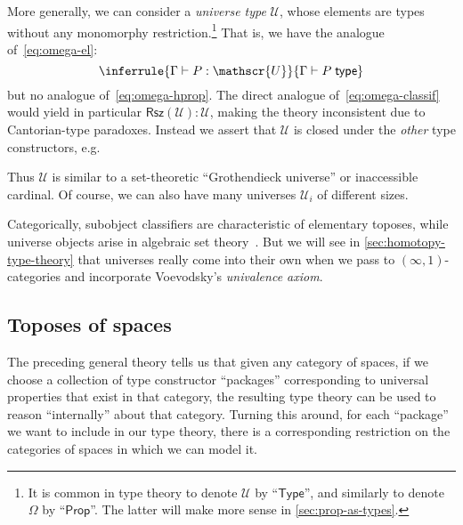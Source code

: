 \documentclass[10pt]{article}
\def\oo{\ensuremath{\infty}}
\def\io{\ensuremath{(\oo,1)}}
\def\ty{\;\mathsf{type}}
\def\tprod{\textstyle\prod}
\def\tsm{\textstyle\sum}
\def\types{\vdash}
\def\U{\mathscr{U}}
\numberwithin{equation}{section}
\begin{document}
More generally, we can consider a \emph{universe type} $\U$, whose elements are types without any monomorphy restriction.\footnote{It is common in type theory to denote $\U$ by ``$\mathsf{Type}$'', and similarly to denote $\Omega$ by ``$\mathsf{Prop}$''.
  The latter will make more sense in \cref{sec:prop-as-types}.}
That is, we have the analogue of~\eqref{eq:omega-el}:
\[ \inferrule{\Gamma \types P:\U}{\Gamma \types P\ty} \]
but no analogue of~\eqref{eq:omega-hprop}.
The direct analogue of~\eqref{eq:omega-classif} would yield in particular $\mathsf{Rsz}(\U):\U$,
making the theory inconsistent due to Cantorian-type paradoxes.
Instead we assert that $\U$ is closed under the \emph{other} type constructors, e.g.
Thus $\U$ is similar to a set-theoretic ``Grothendieck universe'' or inaccessible cardinal.
Of course, we can also have many universes $\U_i$ of different sizes.

Categorically, subobject classifiers are characteristic of elementary toposes, while universe objects arise in algebraic set theory~\cite{jm:ast,ast-website}.
But we will see in \cref{sec:homotopy-type-theory} that universes really come into their own when we pass to \io-categories and incorporate Voevodsky's \emph{univalence axiom}.


\subsection{Toposes of spaces}
\label{sec:toposes-spaces}

The preceding general theory tells us that given any category of spaces, if we choose a collection of type constructor ``packages'' corresponding to universal properties that exist in that category, the resulting type theory can be used to reason ``internally'' about that category.
Turning this around, for each ``package'' we want to include in our type theory, there is a corresponding restriction on the categories of spaces in which we can model it. %
\end{document}
